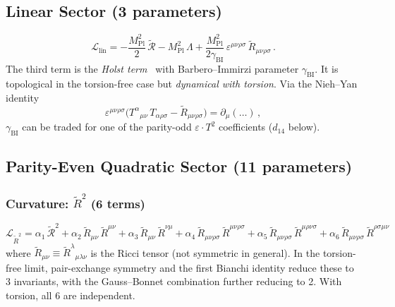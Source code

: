 \documentclass[12pt,a4paper]{article}
\newcommand{\Rt}{\tilde{R}}         %
\newcommand{\Ric}{\tilde{\mathcal{R}}} %
\newcommand{\pd}{\partial}           %
\newcommand{\eps}{\varepsilon}       %
\newcommand{\Mpl}{M_{\mathrm{Pl}}}  %
\begin{document}
\subsection{Linear Sector (3 parameters)}
\label{sec:linear}

\begin{equation}
  \mathcal{L}_{\text{lin}}
  = -\frac{\Mpl^2}{2}\,\Ric - \Mpl^2\,\Lambda
  + \frac{\Mpl^2}{2\gamma_{\text{BI}}}\,
    \eps^{\mu\nu\rho\sigma}\, \Rt_{\mu\nu\rho\sigma}\,.
  \label{eq:linear}
\end{equation}
The third term is the \emph{Holst term}~\cite{Holst:1995pc}
with Barbero--Immirzi parameter $\gamma_{\text{BI}}$.
It is topological in the torsion-free case but
\emph{dynamical with torsion}. Via the Nieh--Yan
identity~\cite{NiehYan:1982}
\begin{equation}
  \eps^{\mu\nu\rho\sigma}\bigl(
    T^\alpha{}_{\mu\nu}\, T_{\alpha\rho\sigma}
    - \Rt_{\mu\nu\rho\sigma}\bigr)
  = \pd_\mu(\ldots)\,,
  \label{eq:nieh_yan}
\end{equation}
$\gamma_{\text{BI}}$ can be traded for one of the parity-odd
$\eps \cdot T^2$ coefficients ($d_{14}$ below).


\subsection{Parity-Even Quadratic Sector (11 parameters)}
\label{sec:even}

\subsubsection{Curvature: $\Rt^2$ (6 terms)}

\begin{equation}
\boxed{
  \mathcal{L}_{\Rt^2}
  = \alpha_1\, \Ric^2
  + \alpha_2\, \Rt_{\mu\nu}\,\Rt^{\mu\nu}
  + \alpha_3\, \Rt_{\mu\nu}\,\Rt^{\nu\mu}
  + \alpha_4\, \Rt_{\mu\nu\rho\sigma}\,\Rt^{\mu\nu\rho\sigma}
  + \alpha_5\, \Rt_{\mu\nu\rho\sigma}\,\Rt^{\mu\rho\nu\sigma}
  + \alpha_6\, \Rt_{\mu\nu\rho\sigma}\,\Rt^{\rho\sigma\mu\nu}
}
  \label{eq:curv_squared}
\end{equation}
where $\Rt_{\mu\nu} \equiv \Rt^\lambda{}_{\mu\lambda\nu}$ is the
Ricci tensor (not symmetric in general). In the torsion-free limit,
pair-exchange symmetry and the first Bianchi identity reduce these
to 3 invariants, with the Gauss--Bonnet combination further reducing
to 2. With torsion, all 6 are independent.
\end{document}
